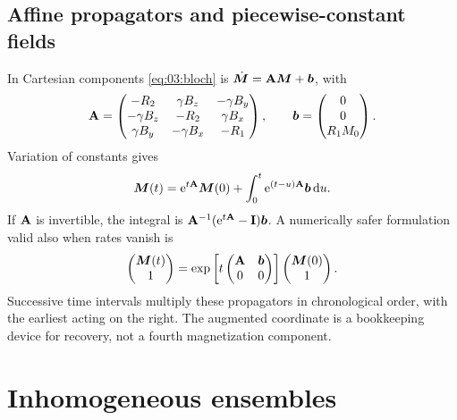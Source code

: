 \subsection{Affine propagators and piecewise-constant fields}
In Cartesian components \cref{eq:03:bloch} is
$\dot{\bm{M}}=\mathbf{A}\bm{M}+\bm{b}$, with
\begin{equation}
 \mathbf{A}=\begin{pmatrix}
 -R_2&\gamma B_z&-\gamma B_y\\
 -\gamma B_z&-R_2&\gamma B_x\\
 \gamma B_y&-\gamma B_x&-R_1
 \end{pmatrix},\qquad
 \bm{b}=\begin{pmatrix}0\\0\\R_1M_0\end{pmatrix}.
 \label{eq:03:generator}
\end{equation}
Variation of constants gives
\[
 \bm{M}(t)=\mathrm{e}^{t\mathbf{A}}\bm{M}(0)+
             \int_0^t\mathrm{e}^{(t-u)\mathbf{A}}\bm{b}\mathop{}\!\mathrm{d} u.
\]
If $\mathbf{A}$ is invertible, the integral is
$\mathbf{A}^{-1}(\mathrm{e}^{t\mathbf{A}}-\mathbf{I})\bm{b}$.
A numerically safer formulation valid also when rates vanish is
\begin{equation}
 \begin{pmatrix}\bm{M}(t)\\1\end{pmatrix}
 =\exp\left[t\begin{pmatrix}\mathbf{A}&\bm{b}\\0&0\end{pmatrix}\right]
  \begin{pmatrix}\bm{M}(0)\\1\end{pmatrix}.
 \label{eq:03:affine}
\end{equation}
Successive time intervals multiply these propagators in chronological
order, with the earliest acting on the right. The augmented coordinate
is a bookkeeping device for recovery, not a fourth magnetization component.

\section{Inhomogeneous ensembles}
\label{sec:03:inhomogeneous-ensembles}
